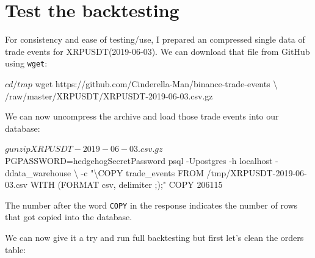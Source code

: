 \documentclass[
  oneside]{book}
\newenvironment{Shaded}{\begin{snugshade}}{\end{snugshade}}
\newcommand{\AttributeTok}[1]{\textcolor[rgb]{0.13,0.29,0.53}{#1}}
\newcommand{\DataTypeTok}[1]{\textcolor[rgb]{0.13,0.29,0.53}{#1}}
\newcommand{\ExtensionTok}[1]{#1}
\newcommand{\KeywordTok}[1]{\textcolor[rgb]{0.13,0.29,0.53}{\textbf{#1}}}
\newcommand{\NormalTok}[1]{#1}
\newcommand{\OperatorTok}[1]{\textcolor[rgb]{0.81,0.36,0.00}{\textbf{#1}}}
\newcommand{\StringTok}[1]{\textcolor[rgb]{0.31,0.60,0.02}{#1}}
\newcommand{\VariableTok}[1]{\textcolor[rgb]{0.00,0.00,0.00}{#1}}
\begin{document}
\section{Test the backtesting}\label{test-the-backtesting}

For consistency and ease of testing/use, I prepared an compressed single data of trade events for XRPUSDT(2019-06-03). We can download that file from GitHub using \texttt{wget}:

\begin{Shaded}
\begin{Highlighting}[]
\ExtensionTok{$}\NormalTok{ cd /tmp}
\ExtensionTok{$}\NormalTok{ wget https://github.com/Cinderella{-}Man/binance{-}trade{-}events }\DataTypeTok{\textbackslash{}}
\NormalTok{/raw/master/XRPUSDT/XRPUSDT{-}2019{-}06{-}03.csv.gz}
\end{Highlighting}
\end{Shaded}

We can now uncompress the archive and load those trade events into our database:

\begin{Shaded}
\begin{Highlighting}[]
\ExtensionTok{$}\NormalTok{ gunzip XRPUSDT{-}2019{-}06{-}03.csv.gz}
\ExtensionTok{$}\NormalTok{ PGPASSWORD=hedgehogSecretPassword psql }\AttributeTok{{-}Upostgres} \AttributeTok{{-}h}\NormalTok{ localhost }\AttributeTok{{-}ddata\_warehouse} \DataTypeTok{\textbackslash{}}
\NormalTok{{-}c }\StringTok{"\textbackslash{}COPY trade\_events FROM \textquotesingle{}/tmp/XRPUSDT{-}2019{-}06{-}03.csv\textquotesingle{} WITH (FORMAT csv, delimiter \textquotesingle{};\textquotesingle{});"}
\ExtensionTok{COPY}\NormalTok{ 206115}
\end{Highlighting}
\end{Shaded}

The number after the word \texttt{COPY} in the response indicates the number of rows that got copied into the database.

We can now give it a try and run full backtesting but first let's clean the orders table:

\begin{Shaded}
\end{Shaded}
\end{document}

